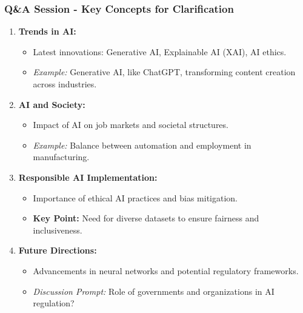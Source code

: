 \documentclass[aspectratio=169]{beamer}
\begin{document}
\begin{frame}[fragile]
    \frametitle{Q\&A Session - Key Concepts for Clarification}
    \begin{enumerate}
        \item \textbf{Trends in AI:}
            \begin{itemize}
                \item Latest innovations: Generative AI, Explainable AI (XAI), AI ethics.
                \item \textit{Example:} Generative AI, like ChatGPT, transforming content creation across industries.
            \end{itemize}
        \item \textbf{AI and Society:}
            \begin{itemize}
                \item Impact of AI on job markets and societal structures.
                \item \textit{Example:} Balance between automation and employment in manufacturing.
            \end{itemize}
        \item \textbf{Responsible AI Implementation:}
            \begin{itemize}
                \item Importance of ethical AI practices and bias mitigation.
                \item \textbf{Key Point:} Need for diverse datasets to ensure fairness and inclusiveness.
            \end{itemize}
        \item \textbf{Future Directions:}
            \begin{itemize}
                \item Advancements in neural networks and potential regulatory frameworks.
                \item \textit{Discussion Prompt:} Role of governments and organizations in AI regulation?
            \end{itemize}
    \end{enumerate}
\end{frame}
\end{document}
